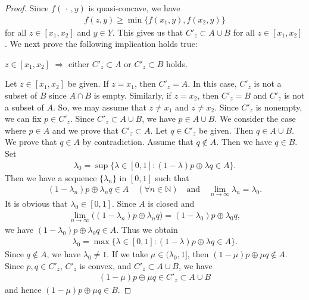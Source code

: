 \documentclass[draft]{amsart}
\numberwithin{equation}{section}
\def\N{\mathbb N}
\theoremstyle{plain}
\theoremstyle{definition}
\theoremstyle{remark}
\begin{document}
\begin{proof}
 Since $f(\,\cdot\,, y)$ is quasi-concave, we have 
 \begin{align}
  f(z,y) \geq \min\{f(x_1,y), f(x_2,y)\}
 \end{align}  
 for all $z\in [x_1,x_2]$ and $y\in Y$. This gives us that 
 $C'_z\subset A\cup B$ for all $z\in [x_1,x_2]$. 
 We next prove the following implication holds true: 
 \begin{center}
 $z\in [x_1,x_2]$ $\Longrightarrow$
 either $C'_z\subset A$ or $C'_z\subset B$ holds. 
 \end{center}
 Let $z\in [x_1,x_2]$ be given. 
 If $z=x_1$, then $C'_z=A$. In this case, 
 $C'_z$ is not a subset of $B$ since $A\cap B$ is empty. 
 Similarly, if $z=x_2$, then $C'_z=B$ and 
 $C'_z$ is not a subset of $A$. 
 So, we may assume that $z\neq x_1$ and $z\neq x_2$. 
 Since $C'_z$ is nonempty, we can fix $p\in C'_z$. 
 Since $C'_z\subset A\cup B$, we have $p\in A\cup B$. 
 We consider the case where 
 $p\in A$ and we prove that $C'_z\subset A$. 
 Let $q\in C'_z$ be given. Then $q\in A\cup B$. 
 We prove that $q\in A$ by contradiction. 
 Assume that $q\notin A$. 
 Then we have $q\in B$. Set 
 \begin{align}
  \lambda_0 = \sup\bigl\{\lambda\in [0,1]: 
 (1-\lambda)p\oplus \lambda q \in A\bigr\}. 
 \end{align}
 Then we have a sequence $\{\lambda_n\}$ in $[0,1]$ such that 
 \begin{align}
  (1-\lambda_n)p \oplus \lambda_n q \in A 
  \quad (\forall n\in \N) \quad \textrm{and} \quad 
  \lim_{n\to \infty}\lambda_n = \lambda_0. 
 \end{align}
 It is obvious that $\lambda_0\in [0,1]$. 
 Since $A$ is closed and 
 \begin{align}
  \lim_{n\to \infty} \bigl(
  (1-\lambda_n)p \oplus \lambda_n q 
  \bigr)
  = (1-\lambda_0)p \oplus \lambda_0 q, 
 \end{align}
 we have 
 $(1-\lambda_0)p \oplus \lambda_0 q \in A$. 
 Thus we obtain 
 \begin{align}
   \lambda_0 = \max\bigl\{\lambda\in [0,1]: 
 (1-\lambda)p\oplus \lambda q \in A\bigr\}. 
 \end{align}
 Since $q\notin A$, we have $\lambda_0\neq 1$. 
 If we take $\mu \in (\lambda_0, 1]$, then 
 $(1-\mu)p \oplus \mu q\notin A$. 
 Since 
 $p, q\in C'_z$, $C'_z$ is convex, and  
 $C'_z\subset A\cup B$, we have 
 \begin{align}
  (1-\mu)p \oplus \mu q \in C'_z \subset A\cup B
 \end{align}
 and hence $(1-\mu)p \oplus \mu q \in B$.  

\end{proof}
\end{document}
